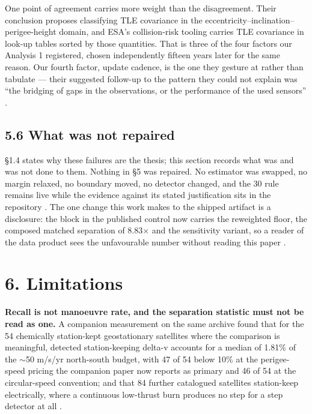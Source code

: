 \documentclass[11pt]{article}
\begin{document}
One point of agreement carries more weight than the disagreement. Their conclusion proposes classifying TLE covariance in the eccentricity--inclination--perigee-height domain, and ESA's collision-risk tooling carries TLE covariance in look-up tables sorted by those quantities. That is three of the four factors our Analysis 1 registered, chosen independently fifteen years later for the same reason. Our fourth factor, update cadence, is the one they gesture at rather than tabulate --- their suggested follow-up to the pattern they could not explain was ``the bridging of gaps in the observations, or the performance of the used sensors''%
.

\subsection*{5.6 What was not repaired}

\S{}1.4 states why these failures are the thesis; this section records what was and was not done to them. Nothing in \S{}5 was repaired. No estimator was swapped, no margin relaxed, no boundary moved, no detector changed, and the 30\textdegree{} rule remains live while the evidence against its stated justification sits in the repository%
. The one change this work makes to the shipped artifact is a disclosure: the  block in the published control now carries the reweighted floor, the composed matched separation of 8.83$\times$ and the sensitivity variant, so a reader of the data product sees the unfavourable number without reading this paper%
.

\section*{6. Limitations}

\textbf{Recall is not manoeuvre rate, and the separation statistic must not be read as one.} A companion measurement on the same archive found that for the 54 chemically station-kept geostationary satellites where the comparison is meaningful, detected station-keeping delta-v accounts for a median of 1.81\% of the $\sim$50 m/s/yr north-south budget, with 47 of 54 below 10\% at the perigee-speed pricing the companion paper now reports as primary and 46 of 54 at the circular-speed convention; and that 84 further catalogued satellites station-keep electrically, where a continuous low-thrust burn produces no step for a step detector at all%
.
\end{document}
